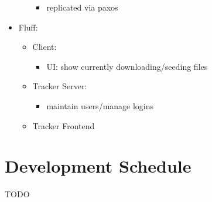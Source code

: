 \documentclass[11pt]{article}
\begin{document}
\begin{itemize}
\begin{itemize}
\begin{itemize}
                            \item replicated via paxos
                        \end{itemize}
                \end{itemize}
            \item Fluff:
                \begin{itemize}
                    \item Client:
                        \begin{itemize}
                            \item UI: show currently downloading/seeding files
                        \end{itemize}
                    \item Tracker Server:
                        \begin{itemize}
                            \item maintain users/manage logins
                        \end{itemize}
                    \item Tracker Frontend
                \end{itemize}
        \end{itemize}

    \section*{Development Schedule}
        TODO
\end{document}
